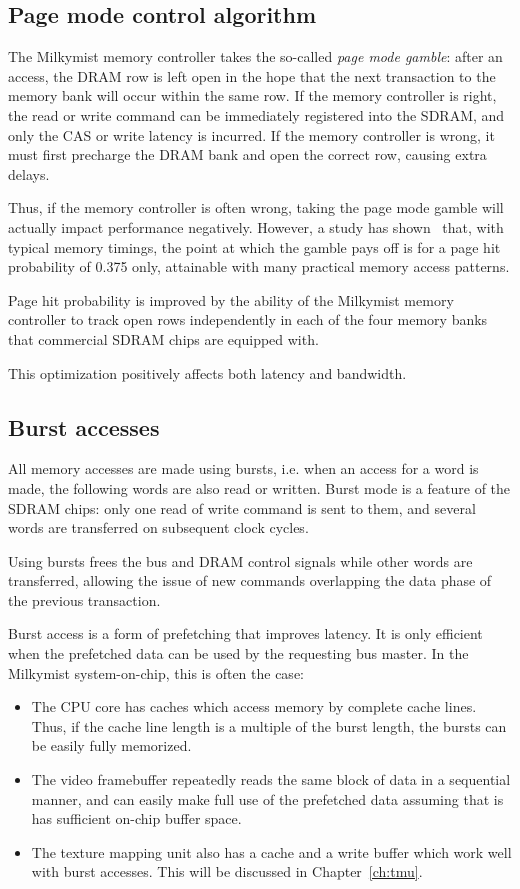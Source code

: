 \documentclass[a4paper,11pt]{kthesis}
\begin{document}
\subsection{Page mode control algorithm}
The Milkymist memory controller takes the so-called \textit{page mode gamble}: after an access, the DRAM row is left open in the hope that the next transaction to the memory bank will occur within the same row. If the memory controller is right, the read or write command can be immediately registered into the SDRAM, and only the CAS or write latency is incurred. If the memory controller is wrong, it must first precharge the DRAM bank and open the correct row, causing extra delays.

Thus, if the memory controller is often wrong, taking the page mode gamble will actually impact performance negatively. However, a study has shown~\cite{pagemode} that, with typical memory timings, the point at which the gamble pays off is for a page hit probability of 0.375 only, attainable with many practical memory access patterns.

Page hit probability is improved by the ability of the Milkymist memory controller to track open rows independently in each of the four memory banks that commercial SDRAM chips are equipped with.

This optimization positively affects both latency and bandwidth.

\subsection{Burst accesses}
\label{subsec:fmlburst}
All memory accesses are made using bursts, i.e. when an access for a word is made, the following words are also read or written. Burst mode is a feature of the SDRAM chips: only one read of write command is sent to them, and several words are transferred on subsequent clock cycles.

Using bursts frees the bus and DRAM control signals while other words are transferred, allowing the issue of new commands overlapping the data phase of the previous transaction.

Burst access is a form of prefetching that improves latency. It is only efficient when the prefetched data can be used by the requesting bus master. In the Milkymist system-on-chip, this is often the case:
\begin{itemize}
\item The CPU core has caches which access memory by complete cache lines. Thus, if the cache line length is a multiple of the burst length, the bursts can be easily fully memorized.
\item The video framebuffer repeatedly reads the same block of data in a sequential manner, and can easily make full use of the prefetched data assuming that is has sufficient on-chip buffer space.
\item The texture mapping unit also has a cache and a write buffer which work well with burst accesses. This will be discussed in Chapter~\ref{ch:tmu}.
\end{itemize}
\end{document}
